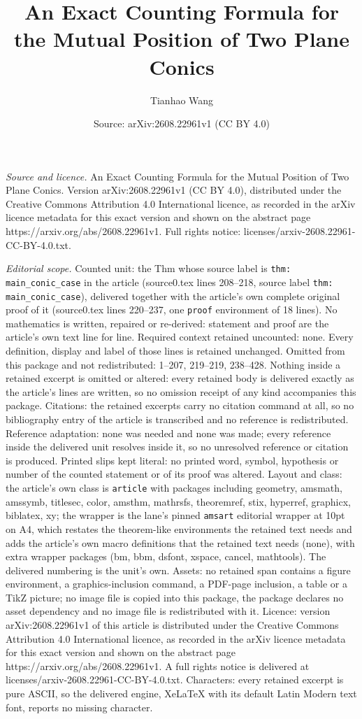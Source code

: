 \documentclass[10pt,a4paper]{amsart}
\title[An Exact Counting Formula for the Mutual Position of Two Pla]{An Exact Counting Formula for the Mutual Position of Two Plane Conics}
\author{Tianhao Wang}
\date{Source: arXiv:2608.22961v1 (CC BY 4.0)}
\begin{document}
\maketitle

\noindent\emph{Source and licence.} An Exact Counting Formula for the Mutual Position of Two Plane Conics. Version arXiv:2608.22961v1 (CC BY 4.0), distributed under the Creative Commons Attribution 4.0 International licence, as recorded in the arXiv licence metadata for this exact version and shown on the abstract page https://arxiv.org/abs/2608.22961v1. Full rights notice: licenses/arxiv-2608.22961-CC-BY-4.0.txt.\par\smallskip

\noindent\textit{Editorial scope.} Counted unit: the Thm whose source label is \texttt{thm: main\_conic\_case} in the article (source0.tex lines 208--218, source label \texttt{thm: main\_conic\_case}), delivered together with the article's own complete original proof of it (source0.tex lines 220--237, one \texttt{proof} environment of 18 lines). No mathematics is written, repaired or re-derived: statement and proof are the article's own text line for line. Required context retained uncounted: none. Every definition, display and label of those lines is retained unchanged. Omitted from this package and not redistributed: 1--207, 219--219, 238--428. Nothing inside a retained excerpt is omitted or altered: every retained body is delivered exactly as the article's lines are written, so no omission receipt of any kind accompanies this package. Citations: the retained excerpts carry no citation command at all, so no bibliography entry of the article is transcribed and no reference is redistributed. Reference adaptation: none was needed and none was made; every reference inside the delivered unit resolves inside it, so no unresolved reference or citation is produced. Printed slips kept literal: no printed word, symbol, hypothesis or number of the counted statement or of its proof was altered. Layout and class: the article's own class is \texttt{article} with packages including geometry, amsmath, amssymb, titlesec, color, amsthm, mathrsfs, theoremref, stix, hyperref, graphicx, biblatex, xy; the wrapper is the lane's pinned \texttt{amsart} editorial wrapper at 10pt on A4, which restates the theorem-like environments the retained text needs and adds the article's own macro definitions that the retained text needs (none), with extra wrapper packages (bm, bbm, dsfont, xspace, cancel, mathtools). The delivered numbering is the unit's own. Assets: no retained span contains a figure environment, a graphics-inclusion command, a PDF-page inclusion, a table or a TikZ picture; no image file is copied into this package, the package declares no asset dependency and no image file is redistributed with it. Licence: version arXiv:2608.22961v1 of this article is distributed under the Creative Commons Attribution 4.0 International licence, as recorded in the arXiv licence metadata for this exact version and shown on the abstract page https://arxiv.org/abs/2608.22961v1. A full rights notice is delivered at licenses/arxiv-2608.22961-CC-BY-4.0.txt. Characters: every retained excerpt is pure ASCII, so the delivered engine, XeLaTeX with its default Latin Modern text font, reports no missing character.
\end{document}
